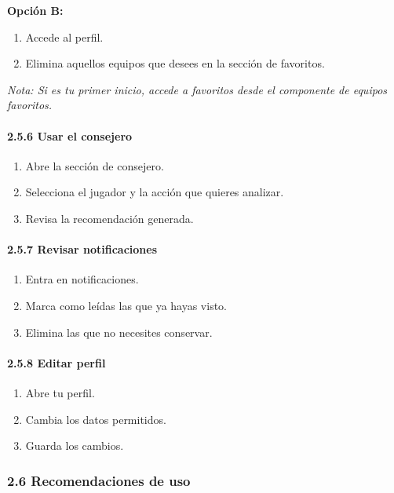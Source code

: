 \textbf{Opción B:}
\begin{enumerate}
    \item Accede al perfil.
    \item Elimina aquellos equipos que desees en la sección de favoritos.
\end{enumerate}

\textit{Nota: Si es tu primer inicio, accede a favoritos desde el componente de equipos favoritos.}

\paragraph*{2.5.6 Usar el consejero}

\begin{enumerate}
    \item Abre la sección de consejero.
    \item Selecciona el jugador y la acción que quieres analizar.
    \item Revisa la recomendación generada.
\end{enumerate}

\paragraph*{2.5.7 Revisar notificaciones}

\begin{enumerate}
    \item Entra en notificaciones.
    \item Marca como leídas las que ya hayas visto.
    \item Elimina las que no necesites conservar.
\end{enumerate}

\paragraph*{2.5.8 Editar perfil}

\begin{enumerate}
    \item Abre tu perfil.
    \item Cambia los datos permitidos.
    \item Guarda los cambios.
\end{enumerate}

\subsubsection*{2.6 Recomendaciones de uso}

